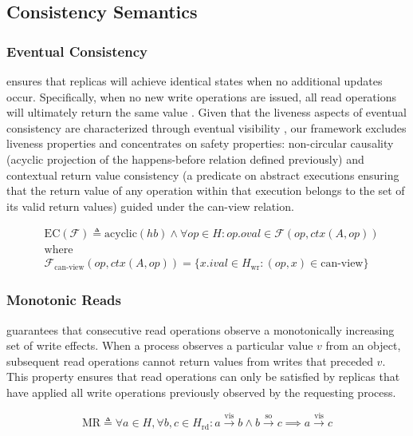 \subsection{Consistency Semantics}

\subsubsection{Eventual Consistency} ensures that replicas will achieve
identical states when no additional updates occur. Specifically, when
no new write operations are issued, all read operations will
ultimately return the same
value \cite{terry1994session, eventual, viotti2016consistency}. Given
that the liveness
aspects of eventual consistency are characterized through eventual
visibility \cite{viotti2016consistency},
our framework excludes liveness properties and concentrates on safety
properties:
non-circular causality (acyclic projection of the happens-before
relation defined previously) and
contextual return value consistency (a predicate on abstract
  executions ensuring that the return value of any operation within
that execution belongs to the set of its valid return values)
guided under the can-view relation.

\begin{align*}
  &\text{EC}(\mathcal{F}) \triangleq \text{acyclic}(hb) \land \forall
  op \in H: op.oval \in \mathcal{F}(op, ctx(A, op)) \\
  &\text{where} \\
  &\mathcal{F}_{\text{can-view}}(op, ctx(A, op)) = \{x.ival \in
  H_\text{wr} : (op, x) \in \text{can-view}\}
\end{align*}

\subsubsection{Monotonic Reads} guarantees that consecutive read operations
observe a monotonically increasing set
of write effects. When a process observes a particular value $v$ from an object,
subsequent read operations cannot return values from writes that preceded $v$.
This property ensures that read operations can only be satisfied by
replicas that have
applied all write operations previously observed by the
requesting process.

$$
\text{MR} \triangleq \forall a \in H, \forall b, c \in H_\text{rd}: a
\xrightarrow{\text{vis}} b \land b \xrightarrow{\text{so}} c \implies
a \xrightarrow{\text{vis}} c
$$

